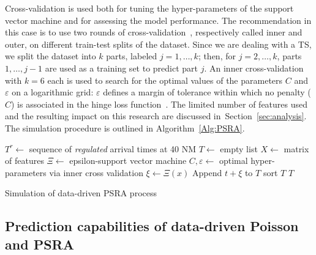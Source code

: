 \documentclass[draft,review]{elsarticle}
\begin{document}
Cross-validation is used both for tuning the hyper-parameters of the support vector machine and for assessing the model performance. The recommendation in this case is to use two rounds of cross-validation~\citep{cawley2010over}, respectively called inner and outer, on different train-test splits of the dataset. Since we are dealing with a TS, we split the dataset into $k$ parts, labeled $j = 1,\ldots,k$; then, for $j = 2, \dots, k$, parts $1, \ldots, j-1$ are used as a training set to predict part $j$.
An inner cross-validation with $k = 6$ each is used to search for the optimal values of the parameters \(C\) and \(\varepsilon\) on a logarithmic grid:
\(\varepsilon\) defines a margin of tolerance within which no penalty (\(C\)) is associated in the hinge loss function~\citep{rosasco2004loss}.
The limited number of features used and the resulting impact on this research are discussed in~Section~\ref{sec:analysis}.
The simulation procedure is outlined in Algorithm~\ref{Alg:PSRA}.

\begin{algorithm}
\begin{algorithmic}[1]
    \STATE \(T^{r} \leftarrow \) sequence of \emph{regulated} arrival times at 40 NM
    \STATE \(T \leftarrow \) empty list
    \STATE \(X \leftarrow \) matrix of features
    \STATE \(\Xi \leftarrow \) epsilon-support vector machine
    \STATE \(C, \varepsilon \leftarrow \) optimal hyper-parameters via inner cross validation
        \STATE \(\xi \leftarrow \Xi(x)\)
        \STATE Append \(t + \xi\) to \(T\)
    \ENDFOR
    \STATE sort \(T\)
    \RETURN \(T\)
\end{algorithmic}
\caption{Simulation of data-driven PSRA process}\label{Alg:PSRA}
\end{algorithm}

\subsection{Prediction capabilities of data-driven Poisson and \acs{PSRA}}\label{sec:dm_comparison}
\end{document}
